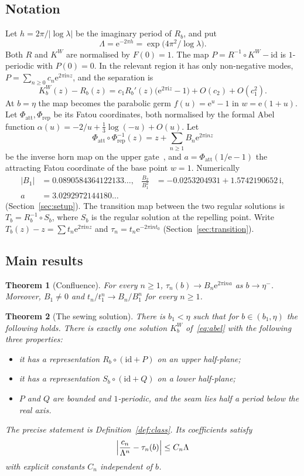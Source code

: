 \documentclass[11pt]{amsart}
\newtheorem{maintheorem}{Theorem}
\theoremstyle{definition}
\newcommand{\Rr}{R}
\newcommand{\Kk}{K}
\newcommand{\eee}{\mathrm{e}}
\newcommand{\ii}{\mathrm{i}}
\begin{document}
\subsection*{Notation}
Let $h=2\pi/|\log\lambda|$ be the imaginary period of $\Rr_b$, and put
\[
 \Lambda=\eee^{-2\pi h}=\exp\bigl(4\pi^2/\log\lambda\bigr).
\]
Both $\Rr$ and $\Kk^W$ are normalised by $F(0)=1$.  The map
$P=\Rr^{-1}\circ\Kk^W-\mathrm{id}$
is $1$-periodic with $P(0)=0$.  In the relevant region it has only
non-negative modes, $P=\sum_{n\ge0}c_n\eee^{2\pi\ii nz}$, and the separation is
\[
 \Kk^W_b(z)-\Rr_b(z)=c_1\Rr_b'(z)\bigl(\eee^{2\pi\ii z}-1\bigr)+O(c_2)+O(c_1^2).
\]
At $b=\eta$ the map becomes the parabolic germ $f(u)=\eee^u-1$ in
$w=\eee(1+u)$.  Let $\Phi_{\mathrm{att}},\Phi_{\mathrm{rep}}$ be its Fatou
coordinates, both normalised by the formal Abel function
$\alpha(u)=-2/u+\tfrac13\log(-u)+O(u)$.  Let
\[
 \Phi_{\mathrm{att}}\circ\Phi_{\mathrm{rep}}^{-1}(z)=z+\sum_{n\ge1}B_n\eee^{2\pi\ii nz}
\]
be the inverse horn map on the upper gate~\cite{Ecalle1981,Voronin1981}, and $a=\Phi_{\mathrm{att}}(1/\eee-1)$
the attracting Fatou coordinate of the base point $w=1$.  Numerically
\[
 \begin{aligned}
 |B_1|&=0.0890584364122133\ldots, &
 \frac{B_2}{B_1^2}&=-0.0253204931+1.5742190652\,\ii,\\
 a&=3.0292972144180\ldots
 \end{aligned}
\]
(Section~\ref{sec:setup}).  The transition map between the two regular
solutions is $T_b=\Rr_b^{-1}\circ S_b$, where $S_b$ is the regular solution at
the repelling point.  Write $T_b(z)-z=\sum t_n\eee^{2\pi\ii nz}$ and
$\tau_n=t_n\eee^{-2\pi\ii nt_0}$ (Section~\ref{sec:transition}).

\subsection*{Main results}

\begin{maintheorem}[Confluence]\label{mthm:A}
For every $n\ge1$, $\tau_n(b)\to B_n\eee^{2\pi\ii na}$ as $b\to\eta^-$.
Moreover, $B_1\ne0$ and $t_n/t_1^n\to B_n/B_1^n$ for every $n\ge1$.
\end{maintheorem}

\begin{maintheorem}[The sewing solution]\label{mthm:B}
There is $b_1<\eta$ such that for $b\in(b_1,\eta)$ the following holds.  There
is exactly one solution $\Kk^W_b$ of~\eqref{eq:abel} with the following three
properties:
\begin{itemize}
\item it has a representation $\Rr_b\circ(\mathrm{id}+P)$ on an upper half-plane;
\item it has a representation $S_b\circ(\mathrm{id}+Q)$ on a lower half-plane;
\item $P$ and $Q$ are bounded and $1$-periodic, and the seam lies half a period
  below the real axis.
\end{itemize}
The precise statement is Definition~\ref{def:class}.  Its coefficients satisfy
\[
 \Bigl|\frac{c_n}{\Lambda^n}-\tau_n(b)\Bigr|\le C_n\Lambda
\]
with explicit constants $C_n$ independent of $b$.
\end{maintheorem}
\end{document}
